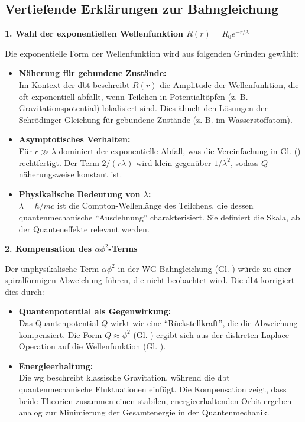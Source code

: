 \subsection{Vertiefende Erklärungen zur Bahngleichung}
\textbf{1. Wahl der exponentiellen Wellenfunktion $R(r)=R_0 e^{-r/\lambda}$}

Die exponentielle Form der Wellenfunktion wird aus folgenden Gründen gewählt:
\begin{itemize}
    \item \textbf{Näherung für gebundene Zustände:}\\Im Kontext der \gls{dbt} beschreibt $R(r)$ die Amplitude der Wellenfunktion, die oft exponentiell abfällt, wenn Teilchen in Potentialtöpfen (z. B. Gravitationspotential) lokalisiert sind. Dies ähnelt den Lösungen der Schrödinger-Gleichung für gebundene Zustände (z. B. im Wasserstoffatom).
    \item \textbf{Asymptotisches Verhalten:}\\Für $r \gg \lambda$ dominiert der exponentielle Abfall, was die Vereinfachung in Gl. () rechtfertigt. Der Term $2/(r \lambda)$ wird klein gegenüber $1/\lambda^{2}$, sodass $Q$ näherungsweise konstant ist.
    \item \textbf{Physikalische Bedeutung von $\lambda$:}\\$\lambda=\hbar/mc$ ist die Compton-Wellenlänge des Teilchens, die dessen quantenmechanische \enquote{Ausdehnung} charakterisiert. Sie definiert die Skala, ab der Quanteneffekte relevant werden.
\end{itemize}

\textbf{2. Kompensation des $\alpha \phi^{2}$-Terms}

Der unphysikalische Term $\alpha \phi^{2}$ in der WG-Bahngleichung (Gl. ) würde zu einer spiralförmigen Abweichung führen, die nicht beobachtet wird.
Die \gls{dbt} korrigiert dies durch:
\begin{itemize}
    \item \textbf{Quantenpotential als Gegenwirkung:}\\Das Quantenpotential $Q$ wirkt wie eine \enquote{Rückstellkraft}, die die Abweichung kompensiert. Die Form $Q \approx \phi^{2}$ (Gl. ) ergibt sich aus der diskreten Laplace-Operation auf die Wellenfunktion (Gl. ).
    \item \textbf{Energieerhaltung:}\\Die \gls{wg} beschreibt klassische Gravitation, während die \gls{dbt} quantenmechanische Fluktuationen einfügt. Die Kompensation zeigt, dass beide Theorien zusammen einen stabilen, energieerhaltenden Orbit ergeben – analog zur Minimierung der Gesamtenergie in der Quantenmechanik.
\end{itemize}

